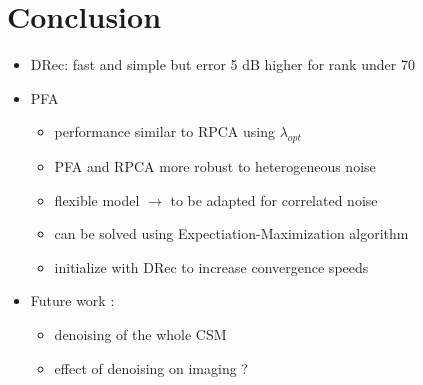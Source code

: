 \documentclass[10pt,xcolor=x11names,compress, notes=show]{beamer}%
\begin{document}
\section*{Conclusion}
\begin{frame}{\insertsectionhead}
	\begin{itemize}
		\item DRec: fast and simple but error 5 dB higher for rank under 70\\
		\vfill
		\item PFA 
		\begin{itemize}
		        \item performance similar to RPCA using $\lambda_{opt}$
			\item PFA and RPCA more robust to heterogeneous noise	
			\item flexible model $\rightarrow$ to be adapted for correlated noise
			\item can be solved using Expectiation-Maximization algorithm
			\item initialize with DRec  to increase convergence speeds
		\end{itemize}
		\vfill
		\item Future work : 
		\begin{itemize}
		        \item denoising of the whole CSM
		        \item effect of denoising on imaging ?
		\end{itemize}
	\end{itemize}
\end{frame}
\end{document}
